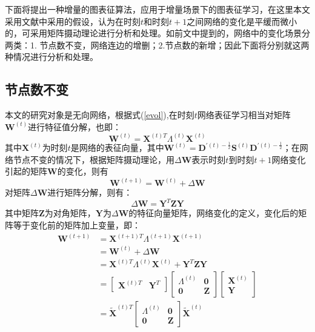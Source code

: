 下面将提出一种增量的图表征算法，应用于增量场景下的图表征学习，在这里本文采用文献\cite{chi2007evolutionary}中采用的假设，认为在时刻$t$和时刻$t+1$之间网络的变化是平缓而微小的，可采用矩阵摄动理论\cite{stewart1990matrix}进行分析和处理。如前文中提到的，网络中的变化场景分两类：1. 节点数不变，网络连边的增删；2.节点数的新增；因此下面将分别就这两种情况进行分析和处理。
\subsection{节点数不变}
本文的研究对象是无向网络，根据式(\ref{evol}),在时刻$t$网络表征学习相当对矩阵$\textbf{W}^{(t)}$进行特征值分解，也即：
\begin{equation}
	\textbf{W}^{(t)} = \textbf{X}^{(t)T} \Lambda^{(t)} \textbf{X} ^{(t)}
\end{equation}
其中$\textbf{X} ^{(t)}$为时刻$t$是网络的表征向量，其中$\textbf{W}^{(t)} = \textbf{D}^{\prime(t)-\frac{1}{2}}\textbf{S}^{(t)}\textbf{D}^{\prime(t)-\frac{1}{2}}$；在网络节点不变的情况下，根据矩阵摄动理论\cite{stewart1990matrix}，用$\Delta\textbf{W}$表示时刻$t$到时刻$t+1$网络变化引起的矩阵$\textbf{W}$的变化，则有
\begin{equation}
	\textbf{W}^{(t+1)} = \textbf{W}^{(t)} + \Delta\textbf{W}
\end{equation}
对矩阵$\Delta\textbf{W}$进行矩阵分解，则有：
\begin{equation}
	\Delta\textbf{W} =  \textbf{Y}^{T} \textbf{Z}  \textbf{Y}
\end{equation}
其中矩阵$\textbf{Z}$为对角矩阵，$\textbf{Y}$为$\Delta\textbf{W}$的特征向量矩阵，网络变化的定义，变化后的矩阵等于变化前的矩阵加上变量，即：
\begin{equation}\label{time_t1}
\begin{aligned}
\textbf{W}^{(t+1)} &= \textbf{X}^{(t+1)T} \Lambda^{(t+1)} \textbf{X} ^{(t+1)} \\
 &= \textbf{W}^{(t)} + \Delta \textbf{W} \\
&= \textbf{X}^{(t)T} \Lambda^{(t)} \textbf{X} ^{(t)} +  \textbf{Y}^{T} \textbf{Z}  \textbf{Y} \\
&= \begin{bmatrix} \textbf{X}^{(t)T} & \textbf{Y}^{T}\end{bmatrix}
   \begin{bmatrix}  \Lambda^{(t)} & \textbf{0}\\
   \textbf{0} & \textbf{Z}
   \end{bmatrix}
   \begin{bmatrix} \textbf{X}^{(t)} \\ \textbf{Y}\end{bmatrix} \\
&= \tilde{\textbf{X}}^{(t)T} 
\begin{bmatrix}  \Lambda^{(t)} & \textbf{0}\\
\textbf{0} & \textbf{Z}
\end{bmatrix}
\tilde{\textbf{X}}^{(t)}
\end{aligned}
\end{equation}
